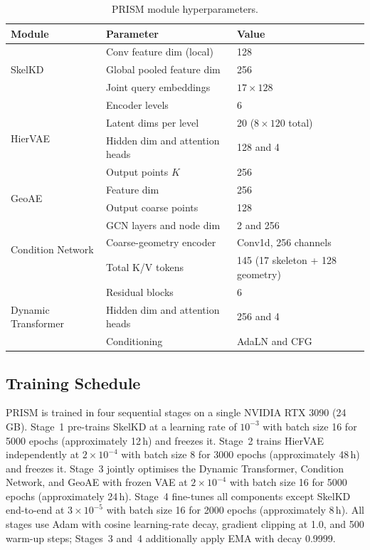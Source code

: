 \documentclass{article}
\begin{document}
\begin{table}[h]
  \centering
  \caption{
    PRISM module hyperparameters.
  }
  \label{tab:arch}
  \small
  \setlength{\tabcolsep}{6pt}
  \begin{tabular}{lll}
    \toprule
    Module & Parameter & Value \\
    \midrule
    \multirow{3}{*}{SkelKD}
      & Conv feature dim (local)        & 128 \\
      & Global pooled feature dim       & 256 \\
      & Joint query embeddings          & $17\times128$ \\
    \midrule
    \multirow{4}{*}{HierVAE}
      & Encoder levels                  & 6 \\
      & Latent dims per level           & 20 ($8\times120$ total) \\
      & Hidden dim and attention heads  & 128 and 4 \\
      & Output points $K$               & 256 \\
    \midrule
    \multirow{2}{*}{GeoAE}
      & Feature dim                     & 256 \\
      & Output coarse points            & 128 \\
    \midrule
    \multirow{3}{*}{Condition Network}
      & GCN layers and node dim         & 2 and 256 \\
      & Coarse-geometry encoder         & Conv1d, 256 channels \\
      & Total K/V tokens                & 145 (17 skeleton + 128 geometry) \\
    \midrule
    \multirow{3}{*}{Dynamic Transformer}
      & Residual blocks                 & 6 \\
      & Hidden dim and attention heads  & 256 and 4 \\
      & Conditioning                    & AdaLN and CFG \\
    \bottomrule
  \end{tabular}
\end{table}

\subsection{Training Schedule}
\label{app:training}

PRISM is trained in four sequential stages on a single NVIDIA RTX 3090 (24\,GB).
Stage~1 pre-trains SkelKD at a learning rate of $10^{-3}$ with batch size 16 for
5000 epochs (approximately 12\,h) and freezes it.
Stage~2 trains HierVAE independently at $2\!\times\!10^{-4}$ with batch size 8
for 3000 epochs (approximately 48\,h) and freezes it.
Stage~3 jointly optimises the Dynamic Transformer, Condition Network, and GeoAE
with frozen VAE at $2\!\times\!10^{-4}$ with batch size 16 for 5000 epochs
(approximately 24\,h).
Stage~4 fine-tunes all components except SkelKD end-to-end at $3\!\times\!10^{-5}$
with batch size 16 for 2000 epochs (approximately 8\,h).
All stages use Adam with cosine learning-rate decay, gradient clipping at 1.0, and 500 warm-up steps;
Stages~3 and~4 additionally apply EMA with decay 0.9999.
\end{document}
